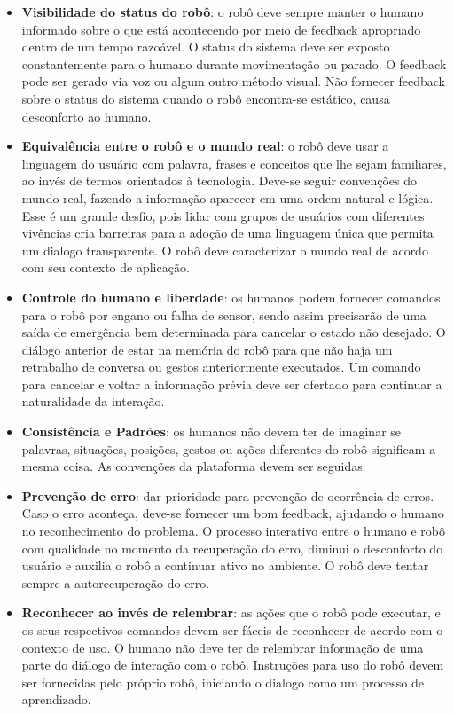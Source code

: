 \begin{itemize}
	\item \textbf{Visibilidade do status do robô}: o robô deve sempre manter o humano informado sobre o que está acontecendo por meio de feedback apropriado dentro de um tempo razoável. O status do sistema deve ser exposto constantemente para o humano durante movimentação ou parado. O feedback pode ser gerado via voz ou algum outro método visual. Não fornecer feedback sobre o status do sistema quando o robô encontra-se estático, causa desconforto ao humano.
	\item \textbf{Equivalência entre o robô e o mundo real}: o robô deve usar a linguagem do usuário com palavra, frases e conceitos que lhe sejam familiares, ao invés de termos orientados à tecnologia. Deve-se seguir convenções do mundo real, fazendo a informação aparecer em uma ordem natural e lógica. Esse é um grande desfio, pois lidar com grupos de usuários com diferentes vivências cria barreiras para a adoção de uma linguagem única que permita um dialogo transparente. O robô deve caracterizar o mundo real de acordo com seu contexto de aplicação.
	\item \textbf{Controle do humano e liberdade}: os humanos podem fornecer comandos para o robô por engano ou falha de sensor, sendo assim precisarão de uma saída de emergência bem determinada para cancelar o estado não desejado. O diálogo anterior de estar na memória do robô para que não haja um retrabalho de conversa ou gestos anteriormente executados. Um comando para cancelar e voltar a informação prévia deve ser ofertado para continuar a naturalidade da interação.
	\item \textbf{Consistência e Padrões}: os humanos não devem ter de imaginar se palavras, situações, posições, gestos ou ações diferentes do robô significam a mesma coisa. As convenções da plataforma devem ser seguidas.
	\item \textbf{Prevenção de erro}: dar prioridade para prevenção de ocorrência de erros. Caso o erro aconteça, deve-se fornecer um bom feedback, ajudando o humano no reconhecimento do problema. O processo interativo entre o humano e robô com qualidade no momento da recuperação do erro, diminui o desconforto do usuário e auxilia o robô a continuar ativo no ambiente. O robô deve tentar sempre a autorecuperação do erro.
	\item \textbf{Reconhecer ao invés de relembrar}: as ações que o robô pode executar, e os seus respectivos comandos devem ser fáceis de reconhecer de acordo com o contexto de uso. O humano não deve ter de relembrar informação de uma parte do diálogo de interação com o robô. Instruções para uso do robô devem ser fornecidas pelo próprio robô, iniciando o dialogo como um processo de aprendizado.

\end{itemize}
